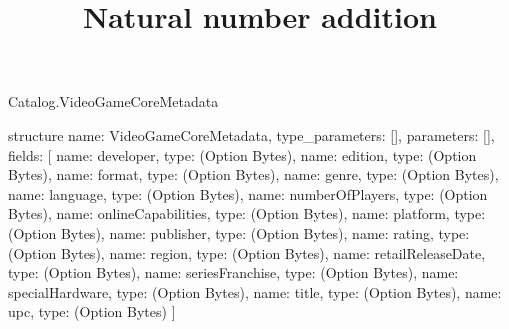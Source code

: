 \begin{lexlean}{Catalog.VideoGameCoreMetadata}
\title{Natural number addition}
\begin{semanticmodule}
structure{
  name: VideoGameCoreMetadata,
  type_parameters: [],
  parameters: [],
  fields: [
    {name: developer, type: (Option Bytes)},
    {name: edition, type: (Option Bytes)},
    {name: format, type: (Option Bytes)},
    {name: genre, type: (Option Bytes)},
    {name: language, type: (Option Bytes)},
    {name: numberOfPlayers, type: (Option Bytes)},
    {name: onlineCapabilities, type: (Option Bytes)},
    {name: platform, type: (Option Bytes)},
    {name: publisher, type: (Option Bytes)},
    {name: rating, type: (Option Bytes)},
    {name: region, type: (Option Bytes)},
    {name: retailReleaseDate, type: (Option Bytes)},
    {name: seriesFranchise, type: (Option Bytes)},
    {name: specialHardware, type: (Option Bytes)},
    {name: title, type: (Option Bytes)},
    {name: upc, type: (Option Bytes)}
  ]
}
\end{semanticmodule}
\end{lexlean}
